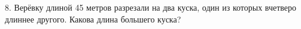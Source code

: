 8. Верёвку длиной 45 метров разрезали на два куска, один из которых вчетверо длиннее другого. Какова длина большего куска?\\
